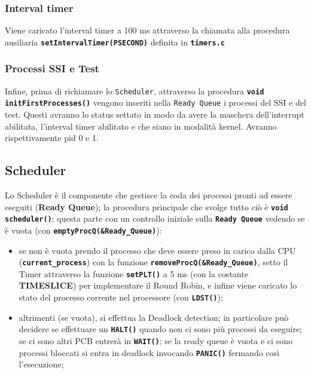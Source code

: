 \documentclass{article}
\begin{document}
\subsubsection{Interval timer}
Viene caricato l'interval timer a 100 ms attraverso la chiamata alla procedura ausiliaria \texttt{\textbf{setIntervalTimer(PSECOND)}} definita in \texttt{\textbf{timers.c}}

\newpage

\subsubsection{Processi SSI e Test}
Infine, prima di richiamare lo \texttt{Scheduler}, attraverso la procedura \texttt{\textbf{void initFirstProcesses()}} vengono inseriti nella \texttt{Ready Queue} i processi del SSI e del test. Questi avranno lo status settato in modo da avere la maschera dell'interrupt abilitata, l'interval timer abilitato e che siano in modalità kernel. Avranno rispettivamente pid 0 e 1.


\subsection{Scheduler}
Lo Scheduler è il componente che gestisce la coda dei processi pronti ad essere eseguiti (\textbf{Ready Queue}); la procedura principale che svolge tutto ciò è \texttt{\textbf{void scheduler()}}; questa parte con un controllo iniziale sulla \texttt{\textbf{Ready Queue}} vedendo se è vuota (con \texttt{\textbf{emptyProcQ(\&Ready\_Queue)}}):
\begin{itemize}
    \item se non è vuota prendo il processo che deve essere preso in carico dalla CPU (\texttt{\textbf{current\_process}}) con la funzione \texttt{\textbf{removeProcQ(\&Ready\_Queue)}}, setto il Timer attraverso la funzione \texttt{\textbf{setPLT()}} a 5 ms (con la costante \textbf{TIMESLICE}) per implementare il Round Robin, e infine viene caricato lo stato del processo corrente nel processore (con \texttt{\textbf{LDST()}});
    \item altrimenti (se vuota), si effettua la Deadlock detection; in particolare può decidere se effettuare un \texttt{\textbf{HALT()}} quando non ci sono più processi da eseguire; se ci sono altri PCB entrerà in \texttt{\textbf{WAIT()}}; se la ready queue è vuota e ci sono processi bloccati si entra in deadlock invocando \texttt{\textbf{PANIC()}} fermando così l'esecuzione;
\end{itemize}
\end{document}
